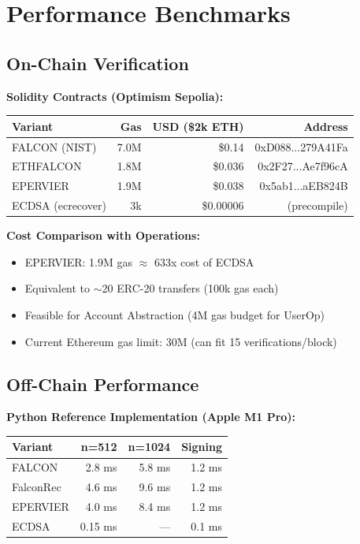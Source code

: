 \section{Performance Benchmarks}


\subsection{On-Chain Verification}

\textbf{Solidity Contracts (Optimism Sepolia):}
\begin{center}
\begin{tabular}{lrrr}
\hline
\textbf{Variant} & \textbf{Gas} & \textbf{USD (\$2k ETH)} & \textbf{Address} \\
\hline
FALCON (NIST) & 7.0M & \$0.14 & 0xD088...279A41Fa \\
ETHFALCON & 1.8M & \$0.036 & 0x2F27...Ae7f96cA \\
EPERVIER & 1.9M & \$0.038 & 0x5ab1...aEB824B \\
\hline
ECDSA (ecrecover) & 3k & \$0.00006 & (precompile) \\
\hline
\end{tabular}
\end{center}

\textbf{Cost Comparison with Operations:}
\begin{itemize}
    \item EPERVIER: 1.9M gas $\approx$ 633x cost of ECDSA
    \item Equivalent to $\sim$20 ERC-20 transfers (100k gas each)
    \item Feasible for Account Abstraction (4M gas budget for UserOp)
    \item Current Ethereum gas limit: 30M (can fit 15 verifications/block)
\end{itemize}

\subsection{Off-Chain Performance}

\textbf{Python Reference Implementation (Apple M1 Pro):}
\begin{center}
\begin{tabular}{lrrr}
\hline
\textbf{Variant} & \textbf{n=512} & \textbf{n=1024} & \textbf{Signing} \\
\hline
FALCON & 2.8 ms & 5.8 ms & 1.2 ms \\
FalconRec & 4.6 ms & 9.6 ms & 1.2 ms \\
EPERVIER & 4.0 ms & 8.4 ms & 1.2 ms \\
\hline
ECDSA & 0.15 ms & --- & 0.1 ms \\
\hline
\end{tabular}
\end{center}

